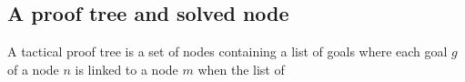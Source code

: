 \documentclass[runningheads,a4paper,draft]{svjour3}
\begin{document}

\subsection{A proof tree and solved node}

A tactical proof tree is a set of nodes containing a list of goals where each 
goal $g$ of a node $n$ is linked to a node $m$ when the list of 
\end{document}
